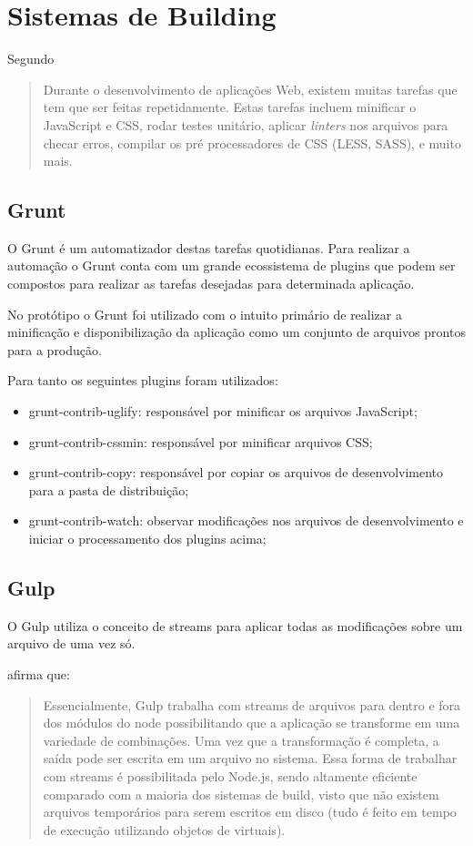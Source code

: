 \chapter{Sistemas de Building}

Segundo \citet{gruntTutorial}
\begin{quote}
Durante o desenvolvimento de aplicações Web, existem muitas tarefas
que tem que ser feitas repetidamente. Estas tarefas incluem minificar o
JavaScript e CSS, rodar testes unitário, aplicar \textit{linters} nos arquivos
para checar erros, compilar os pré processadores de CSS (LESS, SASS), e
muito mais.
\end{quote}

\section{Grunt}

O Grunt é um automatizador destas tarefas quotidianas. Para realizar
a automação o Grunt conta com um grande ecossistema de plugins que
podem ser compostos para realizar as tarefas desejadas para determinada
aplicação.

No protótipo o Grunt foi utilizado com o intuito primário de realizar
a minificação e disponibilização da aplicação como um conjunto de
arquivos prontos para a produção.

Para tanto os seguintes plugins foram utilizados:

\begin{itemize}
    \item grunt-contrib-uglify: responsável por minificar os arquivos JavaScript;
    \item grunt-contrib-cssmin: responsável por minificar arquivos CSS;
    \item grunt-contrib-copy: responsável por copiar os arquivos de desenvolvimento para a pasta de distribuição;
    \item grunt-contrib-watch: observar modificações nos arquivos de desenvolvimento e iniciar o processamento dos plugins acima;
\end{itemize}

\section{Gulp}

O Gulp utiliza o conceito de streams para aplicar todas as modificações sobre
um arquivo de uma vez só.

\citet{crossPlatformMobileGame} afirma que:
\begin{quote}
Essencialmente, Gulp trabalha com streams de arquivos para dentro e fora
dos módulos do node possibilitando que a aplicação se transforme
em uma variedade de combinações. Uma vez que a transformação é
completa, a saída pode ser escrita em um arquivo no sistema. Essa forma
de trabalhar com streams é possibilitada pelo Node.js, sendo altamente
eficiente comparado com a maioria dos sistemas de build, visto que não
existem arquivos temporários para serem escritos em disco (tudo é
feito em tempo de execução utilizando objetos de virtuais).
\end{quote}

